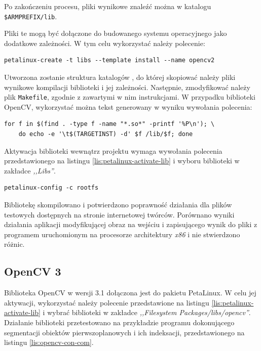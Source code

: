 Po zakończeniu procesu, pliki wynikowe znaleźć można w katalogu \texttt{\$ARMPREFIX/lib}.

Pliki te mogą być dołączone do budowanego systemu operacyjnego jako dodatkowe zależności. 
W tym celu wykorzystać należy polecenie:

\begin{lstlisting}[breaklines=true]
petalinux-create -t libs --template install --name opencv2
\end{lstlisting}

Utworzona zostanie struktura katalogów , do której skopiować należy pliki wynikowe kompilacji biblioteki i jej zależności. 
Następnie, zmodyfikować należy plik \texttt{Makefile}, zgodnie z zawartymi w nim instrukcjami. 
W przypadku biblioteki OpenCV, wykorzystać można tekst generowany w wyniku wywołania polecenia:

\begin{lstlisting}[breaklines=true]
for f in $(find . -type f -name "*.so*" -printf '%P\n'); \
	do echo -e '\t$(TARGETINST) -d' $f /lib/$f; done
\end{lstlisting}

Aktywacja biblioteki wewnątrz projektu wymaga wywołania polecenia przedstawionego na listingu \ref{lis:petalinux-activate-lib} i wyboru biblioteki w zakładce \textit{,,Libs''}. 

\begin{lstlisting}[caption=Dołączenie biblioteki do projektu PetaLinux., label=lis:petalinux-activate-lib]
petalinux-config -c rootfs
\end{lstlisting}



Bibliotekę skompilowano i potwierdzono poprawność działania dla plików testowych dostępnych na stronie internetowej twórców. 
Porównano wyniki działania aplikacji modyfikującej obraz na wejściu i zapisującego wynik do pliki z programem uruchomionym na procesorze architektury \emph{x86} i nie stwierdzono różnic.

\subsection{OpenCV 3}
Biblioteka OpenCV w wersji 3.1 dołączona jest do pakietu PetaLinux. 
W celu jej aktywacji, wykorzystać należy polecenie przedstawione na listingu \ref{lis:petalinux-activate-lib} i wybrać biblioteki w zakładce \emph{,,Filesystem Packages/libs/opencv''}.
Działanie biblioteki przetestowano na przykładzie programu dokonującego segmentacji obiektów pierwszoplanowych i ich indeksacji, przedstawionego na listingu \ref{lis:opencv-con-com}.

